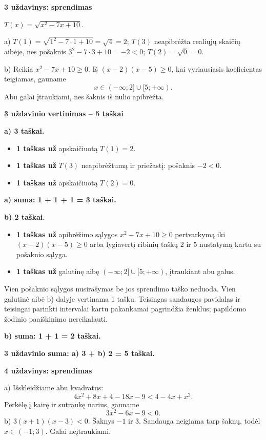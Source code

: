 \documentclass[11pt]{article}
\newcommand{\sk}[1]{\par\medskip\textbf{#1}\par}
\begin{document}
\sk{3 uždavinys: sprendimas}
$T(x)=\sqrt{x^{2} - 7 x + 10}$.
\par a) $T(1)=\sqrt{1^2-7\cdot1+10}=\sqrt4=2$;
$T(3)$ neapibrėžta realiųjų skaičių aibėje, nes pošaknis $3^2-7\cdot3+10=-2<0$;
$T(2)=\sqrt0=0$.
\par b) Reikia $x^{2} - 7 x + 10\ge0$. Iš $(x-2)(x-5)\ge0$, kai vyriausiasis koeficientas teigiamas, gauname
\[x\in(-\infty;2]\cup[5;+\infty).\]
Abu galai įtraukiami, nes šaknis iš nulio apibrėžta.

\sk{3 uždavinio vertinimas -- 5 taškai}
\textbf{a) 3 taškai.}\begin{itemize}
\item \textbf{1 taškas už} apskaičiuotą $T(1)=2$.
\item \textbf{1 taškas už} $T(3)$ neapibrėžtumą ir priežastį: pošaknis $-2<0$.
\item \textbf{1 taškas už} apskaičiuotą $T(2)=0$.
\end{itemize}
\textbf{a) suma: 1 + 1 + 1 = 3 taškai.}\par\textbf{b) 2 taškai.}\begin{itemize}
\item \textbf{1 taškas už} apibrėžimo sąlygos $x^{2} - 7 x + 10\ge0$ pertvarkymą iki $(x-2)(x-5)\ge0$ arba lygiavertį ribinių taškų $2$ ir $5$ nustatymą kartu su pošaknio sąlyga.
\item \textbf{1 taškas už} galutinę aibę $(-\infty;2]\cup[5;+\infty)$, įtraukiant abu galus.
\end{itemize}
Vien pošaknio sąlygos nusirašymas be jos sprendimo taško neduoda. Vien galutinė aibė b) dalyje vertinama 1 tašku. Teisingas sandaugos pavidalas ir teisingai parinkti intervalai kartu pakankamai pagrindžia ženklus; papildomo žodinio paaiškinimo nereikalauti.\par\textbf{b) suma: 1 + 1 = 2 taškai.}\par\textbf{3 uždavinio suma: a) 3 + b) 2 = 5 taškai.}

\sk{4 uždavinys: sprendimas}
a) Išskleidžiame abu kvadratus:
\[4x^2+8x+4-18x-9<4-4x+x^2.\]
Perkėlę į kairę ir sutraukę narius, gauname
\[3 x^{2} - 6 x - 9<0.\]
b) $3(x+1)(x-3)<0$. Šaknys $-1$ ir $3$. Sandauga neigiama tarp šaknų, todėl $\boxed{x\in(-1;3)}$. Galai neįtraukiami.
\end{document}
